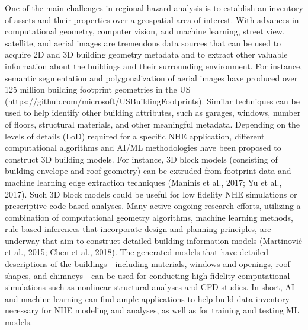 One of the main challenges in regional hazard analysis is to establish an inventory of assets and their properties over a geospatial area of interest. With advances in computational geometry, computer vision, and machine learning, street view, satellite, and aerial images are tremendous data sources that can be used to acquire 2D and 3D building geometry metadata and to extract other valuable information about the buildings and their surrounding environment. For instance, semantic segmentation and polygonalization of aerial images have produced over 125 million building footprint geometries in the US (https://github.com/microsoft/USBuildingFootprints). Similar techniques can be used to help identify other building attributes, such as garages, windows, number of floors, structural materials, and other meaningful metadata. Depending on the levels of details (LoD) required for a specific NHE application, different computational algorithms and AI/ML methodologies have been proposed to construct 3D building models. For instance, 3D block models (consisting of building envelope and roof geometry) can be extruded from footprint data and machine learning edge extraction techniques (Maninis et al., 2017; Yu et al., 2017). Such 3D block models could be useful for low fidelity NHE simulations or prescriptive code-based analyses. Many active ongoing research efforts, utilizing a combination of computational geometry algorithms, machine learning methods, rule-based inferences that incorporate design and planning principles, are underway that aim to construct detailed building information models (Martinović et al., 2015; Chen et al., 2018). The generated models that have detailed descriptions of the buildings—including materials, windows and openings, roof shapes, and chimneys—can be used for conducting high fidelity computational simulations such as nonlinear structural analyses and CFD studies. In short, AI and machine learning can find ample applications to help build data inventory necessary for NHE modeling and analyses, as well as for training and testing ML models. 

